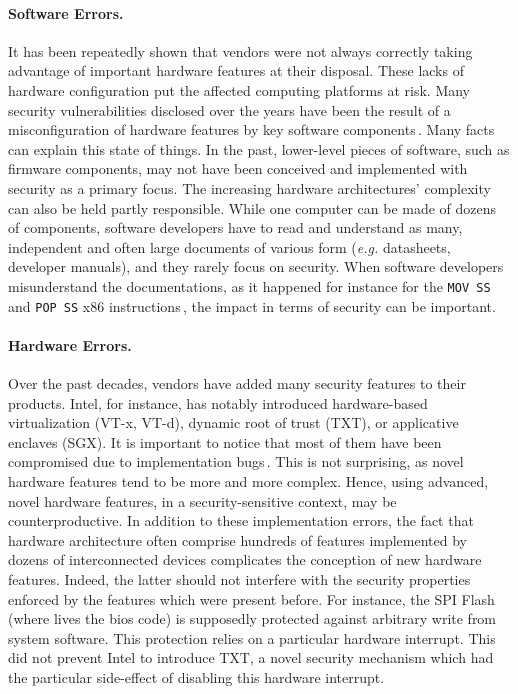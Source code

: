 \paragraph{Software Errors.}
%
It has been repeatedly shown that vendors were not always correctly taking
advantage of important hardware features at their disposal.
%
These lacks of hardware configuration put the affected computing platforms at
risk.
%
Many security vulnerabilities disclosed over the years have been the result of a
misconfiguration of hardware features by key software
components\,\cite{bulygin2014bios}.
%
Many facts can explain this state of things.
%
In the past, lower-level pieces of software, such as firmware components, may
not have been conceived and implemented with security as a primary focus.
%
The increasing hardware architectures' complexity can also be held partly
responsible.
%
While one computer can be made of dozens of components, software developers have
to read and understand as many, independent and often large documents of various
form (\emph{e.g.} datasheets, developer manuals), and they rarely focus on
security.
%
When software developers misunderstand the documentations, as it happened for
instance for the \texttt{MOV SS} and \texttt{POP SS} x86
instructions\,\cite{movsspopss}, the impact in terms of security can be
important.

\paragraph{Hardware Errors.}
%
Over the past decades, vendors have added many security features to their
products.
%
Intel, for instance, has notably introduced hardware-based virtualization (VT-x,
VT-d), dynamic root of trust (TXT), or applicative enclaves (SGX).
%
It is important to notice that most of them have been compromised due to
implementation bugs\,\cite{wojtczuk2011txtbug,sang2010iommu}.
%
This is not surprising, as novel hardware features tend to be more and more
complex.
%
Hence, using advanced, novel hardware features, in a security-sensitive context,
may be counterproductive.
%
In addition to these implementation errors, the fact that hardware architecture
often comprise hundreds of features implemented by dozens of interconnected
devices complicates the conception of new hardware features.
%
Indeed, the latter should not interfere with the security properties enforced by
the features which were present before.
%
For instance, the SPI Flash (where lives the \ac{bios} code) is supposedly
protected against arbitrary write from system software.
%
This protection relies on a particular hardware interrupt.
%
This did not prevent Intel to introduce TXT, a novel security mechanism which
had the particular side-effect of disabling this hardware interrupt.

